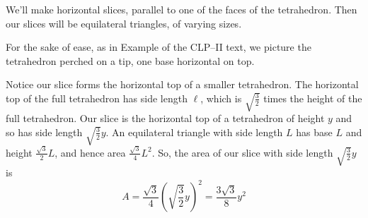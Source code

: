 \begin{solution}
We'll make horizontal slices, parallel to one of the faces of the tetrahedron. Then our slices will be equilateral triangles, of varying sizes.

\begin{center}
\end{center}



 For the sake of ease, as in Example  of the CLP--II text,
we picture the tetrahedron perched on a tip, one base horizontal on top.

\begin{center}
\end{center}

Notice our slice forms the horizontal top of a smaller tetrahedron. The horizontal top of the full tetrahedron has side length $\ell$, which is
             $\sqrt{\frac{3}{2}}$ times the height of the full tetrahedron. Our slice
             is the horizontal top of a tetrahedron of height $y$ and so has side length  $\sqrt{\frac{3}{2}}y$. An equilateral triangle with side length $L$ has base $L$ and height
              $\frac{\sqrt{3}}{2}L$, and hence area $\frac{\sqrt{3}}{4}L^2$.
             So, the area of our slice with side length $\sqrt{\frac{3}{2}}y$ is
\[A = \frac{\sqrt{3}}{4}\left(\sqrt{\frac{3}{2}}y\right)^2 = \frac{3\sqrt{3}}{8}y^2\]


\end{solution}

